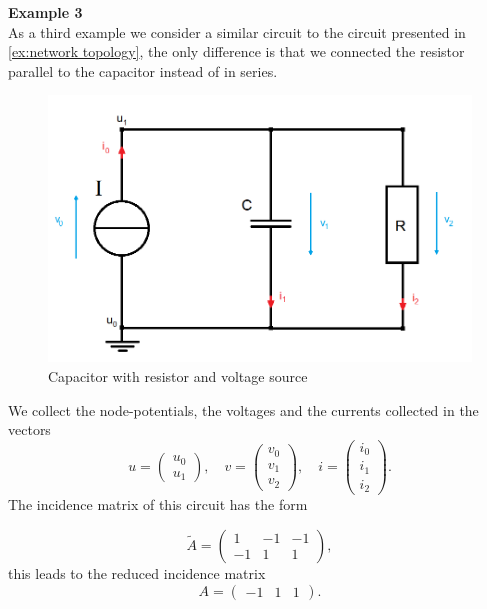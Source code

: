 \textbf{Example 3} \label{ex:Example 3 - incidence matrix } \\
As a third example we consider a similar circuit to the circuit presented in \ref{ex:network topology}, the only difference is that we connected the resistor parallel to the capacitor instead of in series.
\begin{figure}[H]
	\label{circuit:Example 3}
	\centering
	\includegraphics[scale=0.5]{pictures/Example3.png}
	\caption{Capacitor with resistor and voltage source}
\end{figure}

We collect the node-potentials, the voltages and the currents collected in the vectors
\begin{displaymath}
	u=
	\left(
	\begin{matrix}
		u_0 \\
		u_1 
	\end{matrix}
	\right),
	\quad
	v=
	\left(
	\begin{matrix}
		v_0 \\
		v_1 \\
		v_2 
	\end{matrix}
	\right),
	\quad
	i=
	\left(
	\begin{matrix}
		i_0 \\
		i_1 \\
		i_2 
	\end{matrix}
	\right).
\end{displaymath}
The incidence matrix of this circuit has the form

\begin{displaymath}
	\tilde{A} = 
	\left(
	\begin{matrix}
		1 & -1 & -1 \\
		-1 & 1 & 1 
	\end{matrix}
	\right),
\end{displaymath}
this leads to the reduced incidence matrix
\begin{displaymath}
	A = 
	\left(
	\begin{matrix}
		-1 & 1 & 1
	\end{matrix}
	\right).
\end{displaymath}



